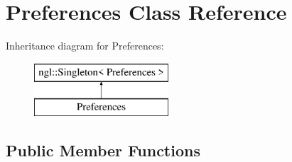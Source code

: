\hypertarget{class_preferences}{}\section{Preferences Class Reference}
\label{class_preferences}
Inheritance diagram for Preferences\+:\begin{figure}[H]
\begin{center}
\leavevmode
\includegraphics[height=2.000000cm]{class_preferences}
\end{center}
\end{figure}
\subsection*{Public Member Functions}
